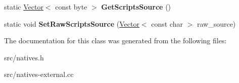 \begin{DoxyCompactItemize}
\item 
\hypertarget{classv8_1_1internal_1_1_natives_collection_ab4d8510a3c919ba488765c60e07459c6}{}static \hyperlink{classv8_1_1internal_1_1_vector}{Vector}$<$ const byte $>$ {\bfseries Get\+Scripts\+Source} ()\label{classv8_1_1internal_1_1_natives_collection_ab4d8510a3c919ba488765c60e07459c6}

\item 
\hypertarget{classv8_1_1internal_1_1_natives_collection_ae7f2f5a5b912069a88a372b8891e53b8}{}static void {\bfseries Set\+Raw\+Scripts\+Source} (\hyperlink{classv8_1_1internal_1_1_vector}{Vector}$<$ const char $>$ raw\+\_\+source)\label{classv8_1_1internal_1_1_natives_collection_ae7f2f5a5b912069a88a372b8891e53b8}

\end{DoxyCompactItemize}


The documentation for this class was generated from the following files\+:\begin{DoxyCompactItemize}
\item 
src/natives.\+h\item 
src/natives-\/external.\+cc\end{DoxyCompactItemize}

